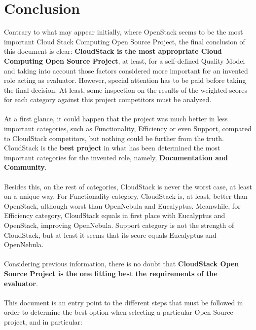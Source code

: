 \documentclass[11pt]{article}
\begin{document}
\section{Conclusion} \label{sec:conclusion}
Contrary to what may appear initially, where OpenStack seems to be the most important Cloud Stack Computing Open Source Project, the final conclusion of this document is clear: \textbf{CloudStack is the most appropriate Cloud Computing Open Source Project}, at least, for a self-defined Quality Model and taking into account those factors considered more important for an invented role acting as evaluator. However, special attention has to be paid before taking the final decision. At least, some inspection on the results of the weighted scores for each category against this project competitors must be analyzed.\\
\\
At a first glance, it could happen that the project was much better in less important categories, such as Functionality, Efficiency or even Support, compared to CloudStack competitors, but nothing could be further from the truth. CloudStack is the \textbf{best project} in what has been determined the most important categories for the invented role, namely, \textbf{Documentation and Community}.\\
\\
Besides this, on the rest of categories, CloudStack is never the worst case, at least on a unique way. For Functionality category, CloudStack is, at least, better than OpenStack, although worst than OpenNebula and Eucalyptus. Meanwhile, for Efficiency category, CloudStack equals in first place with Eucalyptus and OpenStack, improving OpenNebula. Support category is not the strength of CloudStack, but at least it seems that its score equals Eucalyptus and OpenNebula.\\
\\
Considering previous information, there is no doubt that \textbf{CloudStack Open Source Project is the one fitting best the requirements of the evaluator}.\\
\\
This document is an entry point to the different steps that must be followed in order to determine the best option when selecting a particular Open Source project, and in particular:
\end{document}
